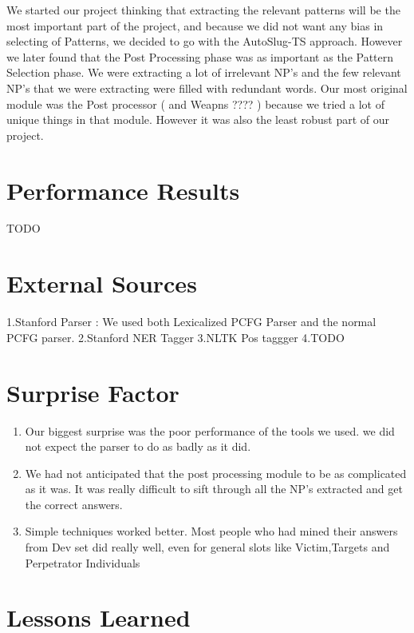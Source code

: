 \documentclass[11pt]{myclass}
\begin{document}
We started our project thinking that extracting the relevant patterns will be the most important part of the project, and because we did not want any bias in selecting of Patterns, we decided to go with the AutoSlug-TS approach. However we later found that the Post Processing phase was as important as the Pattern Selection phase. We were extracting a lot of irrelevant NP’s and the few relevant NP’s that we were extracting were filled with redundant words. Our most original module was the Post processor ( and Weapns ???? ) because we tried a lot of unique things in that module. However it was also the least robust part of our project.


\section{Performance Results}

TODO

\section{External Sources}

 
1.Stanford Parser : We used both Lexicalized  PCFG Parser and the normal PCFG parser.
2.Stanford NER Tagger  
3.NLTK Pos taggger 
4.TODO 

\section{Surprise Factor}

\begin{enumerate}

\item Our biggest surprise was the poor performance of the tools we used. we did not expect the parser to do as badly as it did.  
\item We had not anticipated that the post processing module to be as complicated as it was. It was really difficult to sift through all the NP’s extracted and get the correct answers.
\item Simple techniques worked better. Most people who had mined their answers from Dev set did really well, even for general slots like Victim,Targets and Perpetrator Individuals

\end{enumerate}


\section{Lessons Learned}
\end{document}
